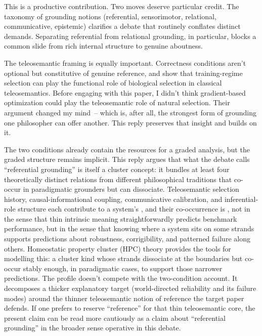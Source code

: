 \documentclass[12pt]{article}
\begin{document}
This is a productive contribution. Two moves deserve particular credit. The taxonomy of grounding notions (referential, sensorimotor, relational, communicative, epistemic) clarifies a debate that routinely conflates distinct demands. Separating referential from relational grounding, in particular, blocks a common slide from rich internal structure to genuine aboutness.

The teleosemantic framing is equally important. Correctness conditions aren't optional but constitutive of genuine reference, and \textcite{coelho_mollo_milliere_2026_vector_grounding_problem} show that training-regime selection can play the functional role of biological selection in classical teleosemantics. Before engaging with this paper, I didn't think gradient-based optimization could play the teleosemantic role of natural selection. Their argument changed my mind~-- which is, after all, the strongest form of grounding one philosopher can offer another. This reply preserves that insight and builds on it.

The two conditions already contain the resources for a graded analysis, but the graded structure remains implicit. This reply argues that what the debate calls \enquote{referential grounding} is itself a cluster concept: it bundles at least four theoretically distinct relations from different philosophical traditions that co-occur in paradigmatic grounders but can dissociate. Teleosemantic selection history, causal-informational coupling, communicative calibration, and inferential-role structure each contribute to a system's , and their co-occurrence is  \citep[see][]{Goodman1955}, not in the sense that thin intrinsic meaning straightforwardly predicts benchmark performance, but in the sense that knowing where a system sits on some strands supports predictions about robustness, corrigibility, and patterned failure along others. Homeostatic property cluster (HPC) theory provides the tools for modelling this: a cluster kind whose strands dissociate at the boundaries but co-occur stably enough, in paradigmatic cases, to support those narrower predictions. The profile doesn't compete with the two-condition account. It decomposes a thicker explanatory target (world-directed reliability and its failure modes) around the thinner teleosemantic notion of reference the target paper defends. If one prefers to reserve \enquote{reference} for that thin teleosemantic core, the present claim can be read more cautiously as a claim about \enquote{referential grounding} in the broader sense operative in this debate.
\end{document}
